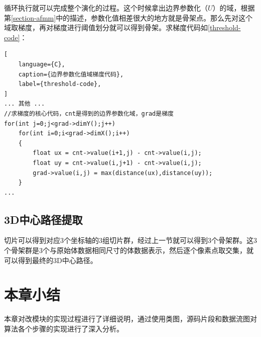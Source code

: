 循环执行就可以完成整个演化的过程。这个时候拿出边界参数化（$U$）的域，根据第\ref{section-afmm}中的描述，参数化值相差很大的地方就是骨架点。那么先对这个域取梯度，再对梯度进行阈值划分就可以得到骨架。求梯度代码如\ref{threshold-code}：
\begin{lstlisting}[
    language={C},
    caption={边界参数化值域梯度代码},
    label={threshold-code},
]
... 其他 ...
//求梯度的核心代码，cnt是得到的边界参数化域，grad是梯度
for(int j=0;j<grad->dimY();j++)	
    for(int i=0;i<grad->dimX();i++)
    {
        float ux = cnt->value(i+1,j) - cnt->value(i,j);
        float uy = cnt->value(i,j+1) - cnt->value(i,j);
        grad->value(i,j) = max(distance(ux),distance(uy));
    }
...
\end{lstlisting}


\subsection{3D中心路径提取}
切片可以得到对应3个坐标轴的3组切片群，经过上一节就可以得到3个骨架群。这3个骨架群是3个与原始体数据相同尺寸的体数据表示，然后逐个像素点取交集，就可以得到最终的3D中心路径。

\section{本章小结}
本章对改模块的实现过程进行了详细说明，通过使用类图，源码片段和数据流图对算法各个步骤的实现进行了深入分析。
